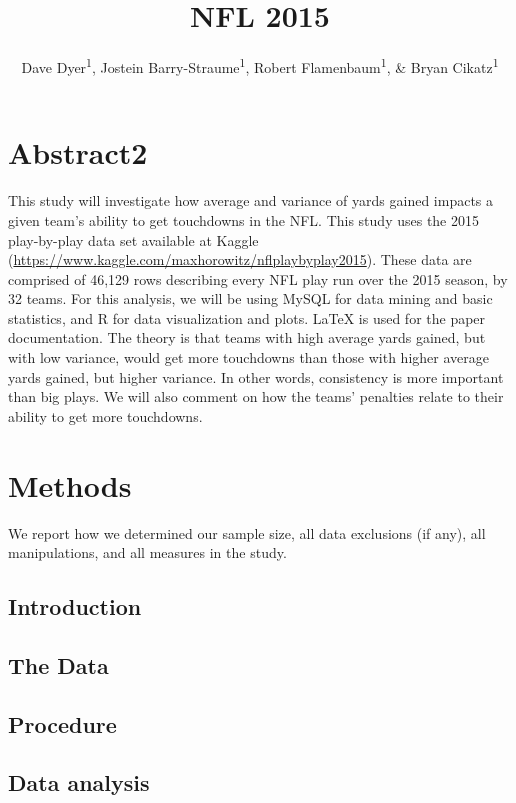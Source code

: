 \documentclass[english,jou]{apa6}
\title{NFL 2015}
\author{Dave Dyer\textsuperscript{1}, Jostein Barry-Straume\textsuperscript{1}, Robert Flamenbaum\textsuperscript{1}, \& Bryan Cikatz\textsuperscript{1}}
\affiliation{
    \vspace{0.5cm}
          \textsuperscript{1} Southern Methodist University  }
\theoremstyle{definition}
\theoremstyle{definition}
\theoremstyle{definition}
\theoremstyle{remark}
\begin{document}
\maketitle

\setcounter{secnumdepth}{0}



\section{Abstract2}\label{abstract2}

This study will investigate how average and variance of yards gained
impacts a given team's ability to get touchdowns in the NFL. This study
uses the 2015 play-by-play data set available at Kaggle
(\url{https://www.kaggle.com/maxhorowitz/nflplaybyplay2015}). These data
are comprised of 46,129 rows describing every NFL play run over the 2015
season, by 32 teams. For this analysis, we will be using MySQL for data
mining and basic statistics, and R for data visualization and plots.
LaTeX is used for the paper documentation. The theory is that teams with
high average yards gained, but with low variance, would get more
touchdowns than those with higher average yards gained, but higher
variance. In other words, consistency is more important than big plays.
We will also comment on how the teams' penalties relate to their ability
to get more touchdowns.

\section{Methods}\label{methods}

We report how we determined our sample size, all data exclusions (if
any), all manipulations, and all measures in the study.

\subsection{Introduction}\label{introduction}

\subsection{The Data}\label{the-data}

\subsection{Procedure}\label{procedure}

\subsection{Data analysis}\label{data-analysis}
\end{document}
